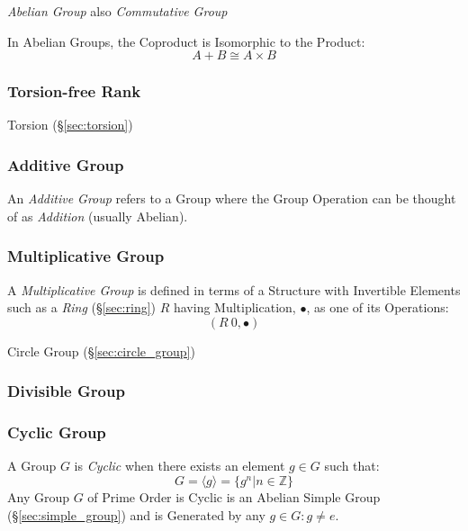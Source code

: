 \emph{Abelian Group} also \emph{Commutative Group}

In Abelian Groups, the Coproduct is Isomorphic to the Product:
\[
  A + B \cong A \times B
\]



\subsubsection{Torsion-free Rank}\label{sec:torsionfree_rank}

Torsion (\S\ref{sec:torsion})



\subsubsection{Additive Group}\label{sec:additive_group}

An \emph{Additive Group} refers to a Group where the Group Operation
can be thought of as \emph{Addition} (usually Abelian).



\subsubsection{Multiplicative Group}\label{sec:multiplicative_group}

A \emph{Multiplicative Group} is defined in terms of a Structure with
Invertible Elements such as a \emph{Ring} (\S\ref{sec:ring}) $R$
having Multiplication, $\bullet$, as one of its Operations:
\[
  (R \ {0}, \bullet)
\]

Circle Group (\S\ref{sec:circle_group})



\subsubsection{Divisible Group}\label{sec:divisible_group}

\subsubsection{Cyclic Group}\label{sec:cyclic_group}

A Group $G$ is \emph{Cyclic} when there exists an element $g \in G$
such that:
\[
    G = \langle g \rangle = \{ g^n | n \in \mathbb{Z} \}
\]
Any Group $G$ of Prime Order is Cyclic is an Abelian Simple Group
(\S\ref{sec:simple_group}) and is Generated by any $g \in G : g \neq
e$.

